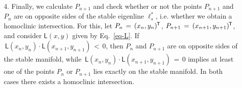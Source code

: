 \documentclass{article}
\theoremstyle{example}
\theoremstyle{plain}
\theoremstyle{definition}
\theoremstyle{remark}
\def\eqref#1{equation~\ref{#1}}
\def\mA{{\bm{A}}}
\renewcommand{\eqref}[1]{Eq.~\ref{#1}}
\newcommand*{\tran}{^{\mkern-1.5mu\mathsf{T}}}
\begin{document}
\begin{itemize}
\begin{align}
\begin{pmatrix}
\hspace{-.07cm}
A_{n+1} - d A_n -1 & \hspace{-.2cm} c A_n \\[1ex]
%
\hspace{-.07cm}
b_r A_n & \hspace{-.2cm}  d A_n - \mathcal{D}_{\mathcal{R}} A_{n-1}-1
\end{pmatrix}
%
\hspace{-.16cm}
\begin{pmatrix}
h_1\\[1ex]
h_2
\end{pmatrix} \hspace{-.08cm} =
%
%
\\[2ex]\label{Pn-cal}
%
 & 
\begin{pmatrix}
\hspace{-.09cm}
%
c A_n \,y_0 - \frac{\Big((1-d)\big[ A_{n+1} -d A_n-1\big]+ c b_r A_n \Big) h_1 + c \big[A_n-\mathcal{D}_{\mathcal{R}} A_{n-1} -1\big] h_2}{\mathcal{P}_{\mathcal{R}}(1)}\\[2ex]
%
\hspace{-.09cm}
\big( d A_n - \mathcal{D}_{\mathcal{R}} A_{n-1}\big)y_0 \, - \, \frac{b_r\big[ A_n (1-\Gamma_{\mathcal{R}}) + A_{n+1} -1 \big]h_1+b^{*}\,h_2}{\mathcal{P}_{\mathcal{R}}(1)} 
\end{pmatrix}
%
\end{align}
\endgroup
~\\
where $A_n$ is given by \eqref{An}; and $\Gamma_{\mathcal{R}}, \mathcal{D}_{\mathcal{R}}$, $\mathcal{P}_{\mathcal{R}}$ are the trace, determinant and characteristic polynomial of $\mA_{\mathcal{R}}$ respectively; and
\begin{align}\label{}
& b^{*}\, = \, (a_r-1)\big( 1 + \mathcal{D}_{\mathcal{R}} A_{n-1}\big) + \big(d-\mathcal{D}_{\mathcal{R}} \big)A_n.
%
\end{align}
Now, by \eqref{Pn-cal} we can compute all iterations %
and thus find the border return time $n$ for which the unstable manifold passes the border again.
~\\
\item[4.] Finally, we calculate $P_{n+1}$ and check whether or not the points $P_{n+1}$ and $P_n$ are on opposite sides of the stable eigenline $\boldsymbol\ell^{*}_{s}$, i.e. whether we obtain a homoclinic intersection. For this, let $P_{n}\,=\, (x_n,y_n)\tran$, $P_{n+1}\,=\, (x_{n+1},y_{n+1})\tran$, and consider $\mathsf{L}(x,y)$ given by \eqref{eq-L}. If $\,\mathsf{L}(x_n,y_n)  \cdot  \mathsf{L}(x_{n+1},y_{n+1}) \, < \,  0$, then $P_{n}$ and $P_{n+1}$ are on opposite sides of the stable manifold, while $\,\mathsf{L}(x_n,y_n)  \cdot  \mathsf{L}(x_{n+1},y_{n+1}) \, = \,  0$ implies at least one of the points $P_{n}$ or $P_{n+1}$ lies exactly on the stable manifold. In both cases there exists a homoclinic intersection.  
\end{itemize}
\end{document}
